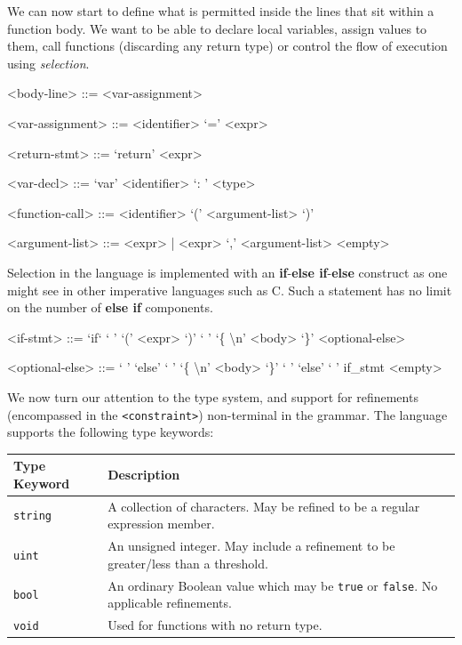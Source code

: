 \documentclass[a4paper,openany,12pt]{book}
\begin{document}
We can now start to define what is permitted inside the lines that sit within a function body.
We want to be able to declare local variables, assign values to them, call functions (discarding any return type) or
control the flow of execution using \emph{selection}.

\begin{grammar}
    <body-line> ::= <var-assignment>

    <var-assignment> ::= <identifier> `=' <expr>

    <return-stmt> ::= `return' <expr>

    <var-decl> ::= `var' <identifier> `: ' <type>

    <function-call> ::= <identifier> `(' <argument-list> `)'

    <argument-list> ::= <expr> | <expr> `,' <argument-list>
    \alt <empty>
\end{grammar}

Selection in the language is implemented with an \textbf{if}-\textbf{else if}-\textbf{else} construct
as one might see in other imperative languages such as C.
Such a statement has no limit on the number of \textbf{else if} components.

\begin{grammar}
    <if-stmt> ::= `if` ` ' `(' <expr> `)' ` ' `\{ \textbackslash n' <body> `\}' <optional-else>

    <optional-else> ::= ` ' `else' ` ' `\{ \textbackslash n' <body> `\}' \alt ` ' `else' ` ' if_stmt \alt <empty>

\end{grammar}

We now turn our attention to the type system, and support for refinements (encompassed in the \texttt{<constraint>})
non-terminal in the grammar.
The language supports the following type keywords:

\def\arraystretch{1.5}
\begin{table}[H]

    \centering
    \begin{tabular}[t]{|p{3cm}|p{8cm}|}
        \hline
        \rowcolor{id7-aubergine}
        {\color[HTML]{FFFFFF} \sffamily \textbf{Type Keyword}} & {\color[HTML]{FFFFFF} \sffamily \textbf{Description}} \\ \hline
        \texttt{string} & A collection of characters. May be refined to be a regular expression member. \\ \hline
        \texttt{uint} & An unsigned integer. May include a refinement to be greater/less than a threshold. \\ \hline
        \texttt{bool} & An ordinary Boolean value which may be \texttt{true} or \texttt{false}. No applicable refinements. \\ \hline
        \texttt{void} & Used for functions with no return type. \\ \hline
    \end{tabular}
\end{table}
\end{document}
